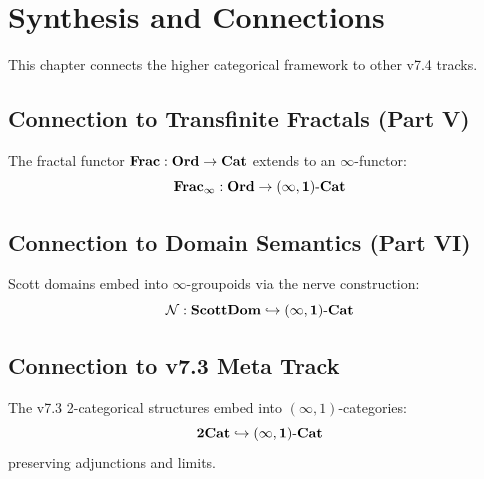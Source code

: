 
\chapter{Synthesis and Connections}
\label{ch:synthesis}

\begin{tcolorbox}[colback=green!5!white,colframe=green!75!black,title=\textbf{Integration}]
This chapter connects the higher categorical framework to other v7.4 tracks.
\end{tcolorbox}

\section{Connection to Transfinite Fractals (Part V)}

\begin{proposition}
\label{prop:fractal-infty}
The fractal functor $\mathbf{Frac} : \mathbf{Ord} \to \mathbf{Cat}$ extends to an
$\infty$-functor:
\[
\mathbf{Frac}_\infty : \mathbf{Ord} \to \mathbf{(\infty,1)\text{-}Cat}
\]
\end{proposition}

\section{Connection to Domain Semantics (Part VI)}

\begin{proposition}
\label{prop:domain-infty}
Scott domains embed into $\infty$-groupoids via the nerve construction:
\[
\mathcal{N} : \mathbf{ScottDom} \hookrightarrow \mathbf{(\infty,1)\text{-}Cat}
\]
\end{proposition}

\section{Connection to v7.3 Meta Track}

\begin{theorem}
\label{thm:2cat-upgrade}
The v7.3 2-categorical structures embed into $(\infty,1)$-categories:
\[
\mathbf{2Cat} \hookrightarrow \mathbf{(\infty,1)\text{-}Cat}
\]
preserving adjunctions and limits.
\end{theorem}

